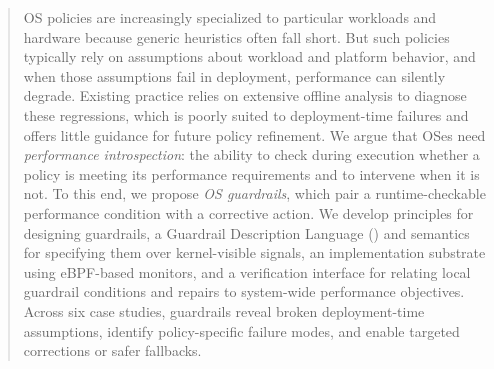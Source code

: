 \begin{abstract}
OS policies are increasingly specialized to particular workloads and hardware because generic heuristics often fall short. But such policies typically rely on assumptions about workload and platform behavior, and when those assumptions fail in deployment, performance can silently degrade. Existing practice relies on extensive offline analysis to diagnose these regressions, which is poorly suited to deployment-time failures and offers little guidance for future policy refinement. We argue that OSes need \emph{performance introspection}: the ability to check during execution whether a policy is meeting its performance requirements and to intervene when it is not. To this end, we propose \emph{OS guardrails}, which pair a runtime-checkable performance condition with a corrective action. We develop principles for designing guardrails, a Guardrail Description Language (\lang) and semantics for specifying them over kernel-visible signals, an implementation substrate using eBPF-based monitors, and a verification interface for relating local guardrail conditions and repairs to system-wide performance objectives. Across six case studies, guardrails reveal broken deployment-time assumptions, identify policy-specific failure modes, and enable targeted corrections or safer fallbacks.
\end{abstract}
